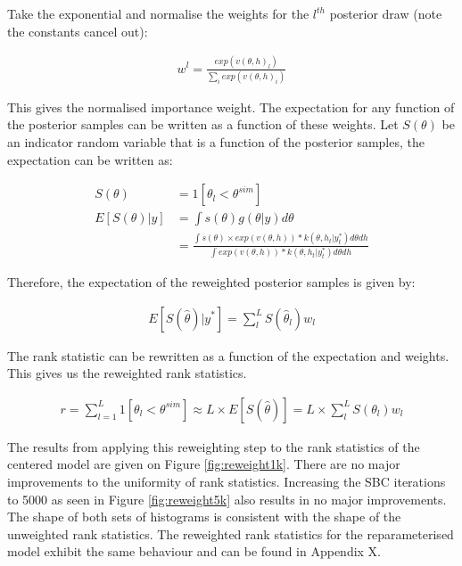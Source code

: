 \documentclass[12pt, a4paper]{article}
\begin{document}
    Take the exponential and normalise the weights for the $l^{th}$ posterior draw (note the constants cancel out):
    
    $$
    \begin{aligned}
    w^l = \frac{exp(v(\theta, h)_l)}{\sum_i exp(v(\theta, h)_i)}
    \end{aligned}
    $$

    This gives the normalised importance weight. The expectation for any function of the posterior samples can be written as a function of these weights. Let $S(\theta)$ be an indicator random variable that is a function of the posterior samples, the expectation can be written as:

    $$
    \begin{aligned}
    S(\theta) &= 1[\theta_l < \theta^{sim}] \\
    E[S(\theta) | y] &= \int s(\theta) g(\theta | y) d\theta\\ 
    &= \frac{\int s(\theta)\times exp(v(\theta, h)) * k(\theta, h_t | y^{\ast}_t)d\theta d h}{\int exp(v(\theta, h)) * k(\theta, h_t | y^{\ast}_t)d\theta d h} 
    \end{aligned}
    $$

    Therefore, the expectation of the reweighted posterior samples is given by:

    $$
    \begin{aligned}
    E[S(\hat{\theta}) | y^{\ast}] = \sum_l^L S(\hat{\theta}_l)w_l
    \end{aligned}
    $$

    The rank statistic can be rewritten as a function of the expectation and weights. This gives us the reweighted rank statistics.

    $$
    \begin{aligned}
    r = \sum_{l=1}^{L}1[\theta_{l} < \theta^{sim}] \approx  L\times E[S(\hat{\theta})] = L\times \sum_l^L S(\theta_l)w_l
    \end{aligned}
    $$

    The results from applying this reweighting step to the rank statistics of the centered model are given on Figure \ref{fig:reweight1k}. There are no major improvements to the uniformity of rank statistics. Increasing the SBC iterations to 5000 as seen in Figure \ref{fig:reweight5k} also results in no major improvements. The shape of both sets of histograms is consistent with the shape of the unweighted rank statistics. The reweighted rank statistics for the reparameterised model exhibit the same behaviour and can be found in Appendix X. 
\end{document}
